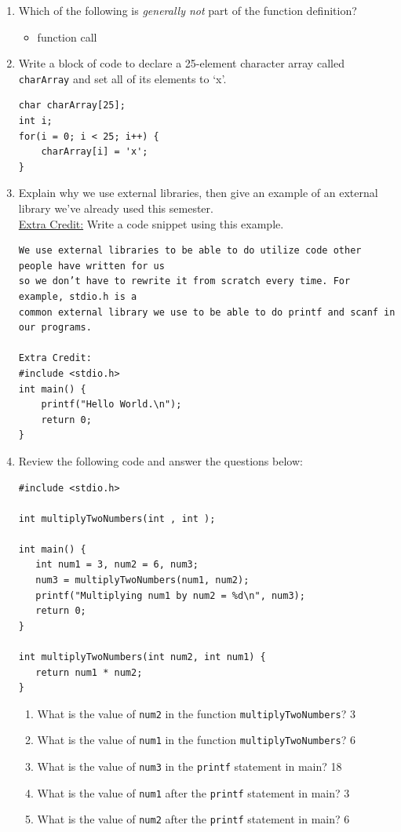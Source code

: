 \documentclass[letter,11pt]{article}
\newcommand*\tick{\item[\Checkmark]}
\begin{document}
\begin{enumerate}
    \item Which of the following is \textit{generally not} part of the function definition?
    \begin{itemize}
        \tick function call
    \end{itemize}
    
    \item Write a block of code to declare a 25-element character array called \texttt{charArray} and set all of its elements to `x'.
    \begin{verbatim}
char charArray[25];
int i;
for(i = 0; i < 25; i++) {
    charArray[i] = 'x';
}
    \end{verbatim}
    
    \newpage
    \item Explain why we use external libraries, then give an example of an external library we've already used this semester. \\
    \underline{Extra Credit:} Write a code snippet using this example.
    \begin{verbatim}
We use external libraries to be able to do utilize code other people have written for us 
so we don’t have to rewrite it from scratch every time. For example, stdio.h is a
common external library we use to be able to do printf and scanf in our programs.

Extra Credit:
#include <stdio.h>
int main() {
    printf("Hello World.\n");
    return 0;
}
    \end{verbatim}
    
    \item Review the following code and answer the questions below:
    \begin{verbatim}
#include <stdio.h>

int multiplyTwoNumbers(int , int );

int main() {
   int num1 = 3, num2 = 6, num3;
   num3 = multiplyTwoNumbers(num1, num2);
   printf("Multiplying num1 by num2 = %d\n", num3);
   return 0;
}

int multiplyTwoNumbers(int num2, int num1) {
   return num1 * num2;
}
    \end{verbatim}
    \begin{enumerate}
        \item What is the value of \texttt{num2} in the function \texttt{multiplyTwoNumbers}? {\color{red}3}
        \item What is the value of \texttt{num1} in the function \texttt{multiplyTwoNumbers}? {\color{red}6}
        \item What is the value of \texttt{num3} in the \texttt{printf} statement in main? {\color{red}18}
        \item What is the value of \texttt{num1} after the \texttt{printf} statement in main? {\color{red}3}
        \item What is the value of \texttt{num2} after the \texttt{printf} statement in main?
        {\color{red}6}
    \end{enumerate}
    

\end{enumerate}
\end{document}
